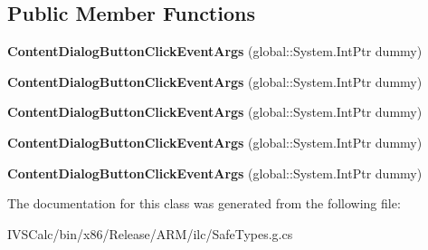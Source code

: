 \subsection*{Public Member Functions}
\begin{DoxyCompactItemize}
\item 
\mbox{\label{class_windows_1_1_u_i_1_1_xaml_1_1_controls_1_1_content_dialog_button_click_event_args_a7f2c9690835134a42cc31bfbbb1deaf0}} 
{\bfseries Content\+Dialog\+Button\+Click\+Event\+Args} (global\+::\+System.\+Int\+Ptr dummy)
\item 
\mbox{\label{class_windows_1_1_u_i_1_1_xaml_1_1_controls_1_1_content_dialog_button_click_event_args_a7f2c9690835134a42cc31bfbbb1deaf0}} 
{\bfseries Content\+Dialog\+Button\+Click\+Event\+Args} (global\+::\+System.\+Int\+Ptr dummy)
\item 
\mbox{\label{class_windows_1_1_u_i_1_1_xaml_1_1_controls_1_1_content_dialog_button_click_event_args_a7f2c9690835134a42cc31bfbbb1deaf0}} 
{\bfseries Content\+Dialog\+Button\+Click\+Event\+Args} (global\+::\+System.\+Int\+Ptr dummy)
\item 
\mbox{\label{class_windows_1_1_u_i_1_1_xaml_1_1_controls_1_1_content_dialog_button_click_event_args_a7f2c9690835134a42cc31bfbbb1deaf0}} 
{\bfseries Content\+Dialog\+Button\+Click\+Event\+Args} (global\+::\+System.\+Int\+Ptr dummy)
\item 
\mbox{\label{class_windows_1_1_u_i_1_1_xaml_1_1_controls_1_1_content_dialog_button_click_event_args_a7f2c9690835134a42cc31bfbbb1deaf0}} 
{\bfseries Content\+Dialog\+Button\+Click\+Event\+Args} (global\+::\+System.\+Int\+Ptr dummy)
\end{DoxyCompactItemize}


The documentation for this class was generated from the following file\+:\begin{DoxyCompactItemize}
\item 
I\+V\+S\+Calc/bin/x86/\+Release/\+A\+R\+M/ilc/Safe\+Types.\+g.\+cs\end{DoxyCompactItemize}
